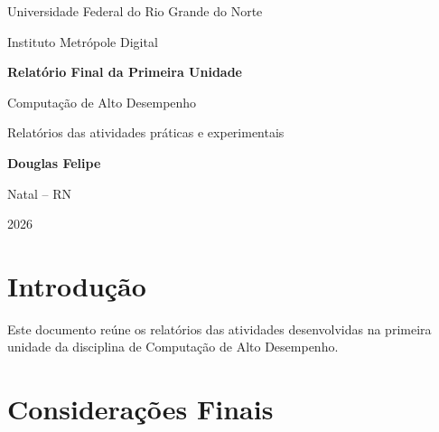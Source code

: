 \documentclass[
    12pt,
    a4paper,
    oneside
]{report}
\begin{document}
\hypersetup{pageanchor=false}

\begin{titlepage}
    \centering

    {\Large Universidade Federal do Rio Grande do Norte\par}
    \vspace{0.3cm}

    {\large Instituto Metrópole Digital\par}

    \vfill

    {\Huge\bfseries Relatório Final da Primeira Unidade\par}

    \vspace{0.4cm}

    {\LARGE Computação de Alto Desempenho\par}

    \vspace{1cm}

    {\large Relatórios das atividades práticas e experimentais\par}

    \vfill

    {\Large\bfseries Douglas Felipe\par}

    \vfill

    {\large Natal -- RN\par}
    {\large 2026\par}
\end{titlepage}


\setcounter{tocdepth}{0}
\tableofcontents
\clearpage

\listoffigures
\clearpage

\listoftables
\clearpage

\hypersetup{pageanchor=true}

\chapter*{Introdução}

Este documento reúne os relatórios das atividades desenvolvidas na primeira unidade da disciplina de Computação de Alto Desempenho.










\chapter*{Considerações Finais}


\printbibliography[
    heading=bibliography,
    title={Referências}
]
\end{document}
